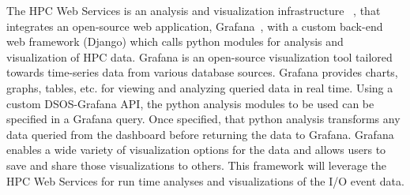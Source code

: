 The HPC Web Services is an analysis and visualization infrastructure ~\cite{ClusterAV}, that integrates an open-source web application, Grafana~\cite{grafana-website}, with a custom back-end web framework (Django)  which calls python modules for analysis and visualization of HPC data. Grafana is an open-source visualization tool tailored towards time-series data from various database sources. Grafana provides charts, graphs, tables, etc. for viewing and analyzing queried data in real time. Using a custom DSOS-Grafana API, the python analysis modules to be used can be specified in a Grafana query. Once specified, that python analysis transforms any data queried from the dashboard before returning the data to Grafana. Grafana enables a wide variety of visualization options for the data and allows users to save and share those visualizations to others. This framework will leverage the HPC Web Services for run time analyses and visualizations of the I/O event data.
